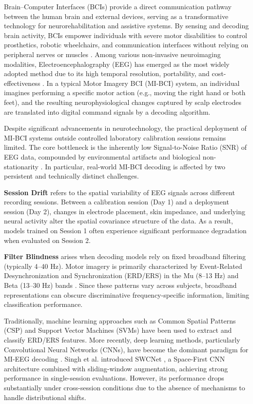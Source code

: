\documentclass[conference]{IEEEtran}
\begin{document}
Brain--Computer Interfaces (BCIs) provide a direct communication pathway between the human brain and external devices, serving as a transformative technology for neurorehabilitation and assistive systems. By sensing and decoding brain activity, BCIs empower individuals with severe motor disabilities to control prosthetics, robotic wheelchairs, and communication interfaces without relying on peripheral nerves or muscles \cite{b2}. Among various non-invasive neuroimaging modalities, Electroencephalography (EEG) has emerged as the most widely adopted method due to its high temporal resolution, portability, and cost-effectiveness \cite{b3}. In a typical Motor Imagery BCI (MI-BCI) system, an individual imagines performing a specific motor action (e.g., moving the right hand or both feet), and the resulting neurophysiological changes captured by scalp electrodes are translated into digital command signals by a decoding algorithm.

Despite significant advancements in neurotechnology, the practical deployment of MI-BCI systems outside controlled laboratory calibration sessions remains limited. The core bottleneck is the inherently low Signal-to-Noise Ratio (SNR) of EEG data, compounded by environmental artifacts and biological non-stationarity \cite{b4}. In particular, real-world MI-BCI decoding is affected by two persistent and technically distinct challenges.

\textbf{Session Drift} refers to the spatial variability of EEG signals across different recording sessions. Between a calibration session (Day 1) and a deployment session (Day 2), changes in electrode placement, skin impedance, and underlying neural activity alter the spatial covariance structure of the data. As a result, models trained on Session 1 often experience significant performance degradation when evaluated on Session 2.

\textbf{Filter Blindness} arises when decoding models rely on fixed broadband filtering (typically 4--40 Hz). Motor imagery is primarily characterized by Event-Related Desynchronization and Synchronization (ERD/ERS) in the Mu (8--13 Hz) and Beta (13--30 Hz) bands \cite{b5}. Since these patterns vary across subjects, broadband representations can obscure discriminative frequency-specific information, limiting classification performance.

Traditionally, machine learning approaches such as Common Spatial Patterns (CSP) and Support Vector Machines (SVMs) have been used to extract and classify ERD/ERS features. More recently, deep learning methods, particularly Convolutional Neural Networks (CNNs), have become the dominant paradigm for MI-EEG decoding \cite{b6,b7}. Singh et al. introduced SWCNet \cite{b1}, a Space-First CNN architecture combined with sliding-window augmentation, achieving strong performance in single-session evaluations. However, its performance drops substantially under cross-session conditions due to the absence of mechanisms to handle distributional shifts.
\end{document}

